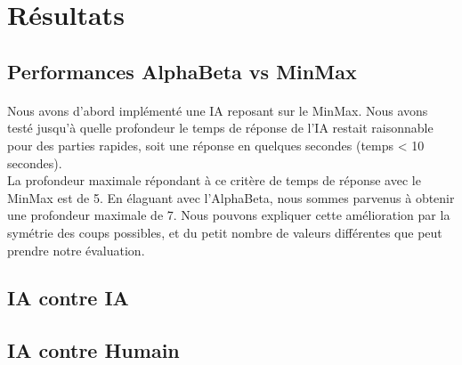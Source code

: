 \documentclass[article, backcover, french, nodocumentinfo]{upmethodology-document}
\begin{document}
	\section{Résultats}
		\subsection{Performances AlphaBeta vs MinMax}
			\paragraph{}
				Nous avons d'abord implémenté une IA reposant sur le MinMax. Nous avons testé jusqu'à quelle profondeur le temps de réponse de l'IA restait raisonnable pour des parties rapides, soit une réponse en quelques secondes (temps < 10 secondes).\\
				La profondeur maximale répondant à ce critère de temps de réponse avec le MinMax est de 5. En élaguant avec l'AlphaBeta, nous sommes parvenus à obtenir une profondeur maximale de 7. Nous pouvons expliquer cette amélioration par la symétrie des coups possibles, et du petit nombre de valeurs différentes que peut prendre notre évaluation.
		\subsection{IA contre IA}
		\subsection{IA contre Humain}
\end{document}
